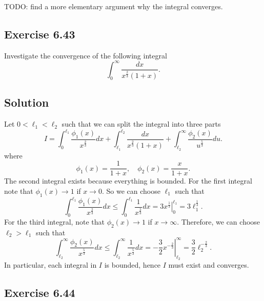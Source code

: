 TODO: find a more elementary argument why the integral converges.


\subsection*{Exercise 6.43}

Investigate the convergence of the following integral
\begin{equation*}
    \int_0^{\infty} \frac{dx}{x^{\frac{2}{3}}(1 + x)}.
\end{equation*}

\subsection*{Solution}

Let $0 < \ell_1 < \ell_2$ such that we can split the integral into three parts
\begin{equation*}
    I = \int_0^{\ell_1} \frac{\phi_1(x)}{x^{\frac{2}{3}}} dx + \int_{\ell_1}^{\ell_2} \frac{dx}{x^{\frac{2}{3}}(1 + x)} + \int_{\ell_2}^{\infty} \frac{\phi_2(x)}{u^{\frac{5}{3}}} du.
\end{equation*}
where
\begin{equation*}
    \phi_1(x) = \frac{1}{1 + x}, \quad \phi_2(x) = \frac{x}{1 + x}.
\end{equation*}
The second integral exists because everything is bounded.
For the first integral note that $\phi_1(x) \to 1$ if $x \to 0$.
So we can choose $\ell_1$ such that
\begin{equation*}
    \int_0^{\ell_1} \frac{\phi_1(x)}{x^{\frac{2}{3}}} dx \leq \int_0^{\ell_1} \frac{1}{x^{\frac{2}{3}}} dx
        = \left. 3 x^{\frac{1}{3}} \right|_0^{\ell_1}
        = 3 \ell_1^{\frac{1}{3}}.
\end{equation*}
For the third integral, note that $\phi_2(x) \to 1$ if $x \to \infty$.
Therefore, we can choose $\ell_2 > \ell_1$ such that
\begin{equation*}
    \int_{\ell_2}^{\infty} \frac{\phi_2(x)}{x^{\frac{5}{3}}} dx
        \leq \int_{\ell_2}^{\infty} \frac{1}{x^{\frac{5}{3}}} dx
        = \left. -\frac{3}{2} x^{-\frac{2}{3}} \right|_{\ell_2}^{\infty}
        = \frac{3}{2} \ell_2^{-\frac{2}{3}}.
\end{equation*}
In particular, each integral in $I$ is bounded, hence $I$ must exist and converges.


\subsection*{Exercise 6.44}

